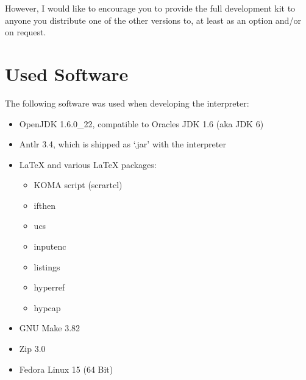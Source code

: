 However, I would like to encourage you to provide the full development kit to anyone you distribute one of the other versions to, at least as an option and\slash{}or on request.

\section{Used Software}

The following software was used when developing the \setlX{} interpreter:

\begin{itemize}
	\item OpenJDK 1.6.0\_22, compatible to Oracles JDK 1.6 (aka JDK 6)
	\item Antlr 3.4, which is shipped as `.jar' with the interpreter
	\item \LaTeX{} and various \LaTeX{} packages:
		\begin{itemize}
			\item KOMA script (scrartcl)
			\item ifthen
			\item ucs
			\item inputenc
			\item listings
			\item hyperref
			\item hypcap
		\end{itemize}
	\item GNU Make 3.82
	\item Zip 3.0
	\item Fedora Linux 15 (64 Bit)
\end{itemize}


